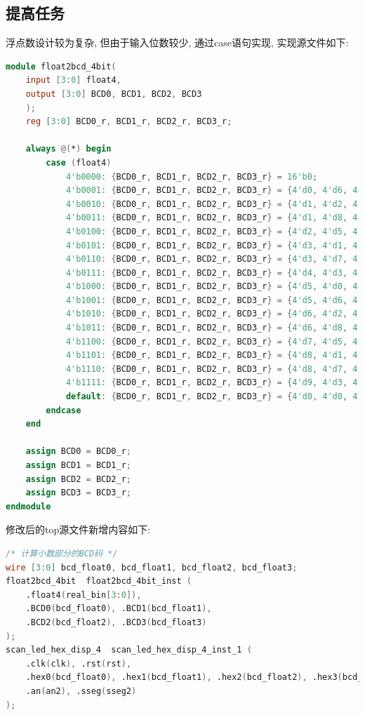 \documentclass{article}
\begin{document}
\subsection*{提高任务}
浮点数设计较为复杂, 但由于输入位数较少, 通过case语句实现, 实现源文件如下:
\begin{lstlisting}[language=Verilog, caption={二进制小数转十进制}]
module float2bcd_4bit(
    input [3:0] float4,
    output [3:0] BCD0, BCD1, BCD2, BCD3
    );
    reg [3:0] BCD0_r, BCD1_r, BCD2_r, BCD3_r;

    always @(*) begin
        case (float4)
            4'b0000: {BCD0_r, BCD1_r, BCD2_r, BCD3_r} = 16'b0;                    // 0.0000
            4'b0001: {BCD0_r, BCD1_r, BCD2_r, BCD3_r} = {4'd0, 4'd6, 4'd2, 4'd5}; // 0.0625
            4'b0010: {BCD0_r, BCD1_r, BCD2_r, BCD3_r} = {4'd1, 4'd2, 4'd5, 4'd0}; // 0.125
            4'b0011: {BCD0_r, BCD1_r, BCD2_r, BCD3_r} = {4'd1, 4'd8, 4'd7, 4'd5}; // 0.1875
            4'b0100: {BCD0_r, BCD1_r, BCD2_r, BCD3_r} = {4'd2, 4'd5, 4'd0, 4'd0}; // 0.25
            4'b0101: {BCD0_r, BCD1_r, BCD2_r, BCD3_r} = {4'd3, 4'd1, 4'd2, 4'd5}; // 0.3125
            4'b0110: {BCD0_r, BCD1_r, BCD2_r, BCD3_r} = {4'd3, 4'd7, 4'd5, 4'd0}; // 0.375
            4'b0111: {BCD0_r, BCD1_r, BCD2_r, BCD3_r} = {4'd4, 4'd3, 4'd7, 4'd5}; // 0.4375
            4'b1000: {BCD0_r, BCD1_r, BCD2_r, BCD3_r} = {4'd5, 4'd0, 4'd0, 4'd0}; // 0.5
            4'b1001: {BCD0_r, BCD1_r, BCD2_r, BCD3_r} = {4'd5, 4'd6, 4'd2, 4'd5}; // 0.5625
            4'b1010: {BCD0_r, BCD1_r, BCD2_r, BCD3_r} = {4'd6, 4'd2, 4'd5, 4'd0}; // 0.625
            4'b1011: {BCD0_r, BCD1_r, BCD2_r, BCD3_r} = {4'd6, 4'd8, 4'd7, 4'd5}; // 0.6875
            4'b1100: {BCD0_r, BCD1_r, BCD2_r, BCD3_r} = {4'd7, 4'd5, 4'd0, 4'd0}; // 0.75
            4'b1101: {BCD0_r, BCD1_r, BCD2_r, BCD3_r} = {4'd8, 4'd1, 4'd2, 4'd5}; // 0.8125
            4'b1110: {BCD0_r, BCD1_r, BCD2_r, BCD3_r} = {4'd8, 4'd7, 4'd5, 4'd0}; // 0.875
            4'b1111: {BCD0_r, BCD1_r, BCD2_r, BCD3_r} = {4'd9, 4'd3, 4'd7, 4'd5}; // 0.9375
            default: {BCD0_r, BCD1_r, BCD2_r, BCD3_r} = {4'd0, 4'd0, 4'd0, 4'd0}; // Default case
        endcase    
    end

    assign BCD0 = BCD0_r;
    assign BCD1 = BCD1_r;
    assign BCD2 = BCD2_r;
    assign BCD3 = BCD3_r;
endmodule
\end{lstlisting}
修改后的top源文件新增内容如下:
\begin{lstlisting}[language=Verilog, caption={添加小数部分的Top文件修改内容}]
/* 计算小数部分的BCD码 */
wire [3:0] bcd_float0, bcd_float1, bcd_float2, bcd_float3;
float2bcd_4bit  float2bcd_4bit_inst (
    .float4(real_bin[3:0]),
    .BCD0(bcd_float0), .BCD1(bcd_float1),
    .BCD2(bcd_float2), .BCD3(bcd_float3)
);
scan_led_hex_disp_4  scan_led_hex_disp_4_inst_1 (
    .clk(clk), .rst(rst),
    .hex0(bcd_float0), .hex1(bcd_float1), .hex2(bcd_float2), .hex3(bcd_float3), .dp(4'b0000),
    .an(an2), .sseg(sseg2)
);
\end{lstlisting}
\end{document}
